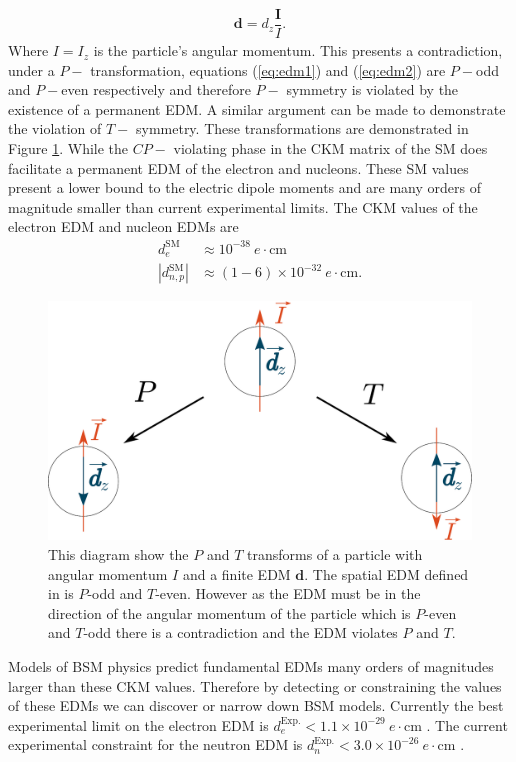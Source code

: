 \documentclass[10pt,a4paper, twoside, openright]{report}
\begin{document}
\begin{align} \label{eq:edm2}
\textbf{d}  = d_z \dfrac{\textbf{I}}{I}.
\end{align}
Where $I = I_z$ is the particle's angular momentum. This presents a contradiction, under a  $P-$  transformation, equations (\ref{eq:edm1}) and (\ref{eq:edm2}) are $P-$odd and $P-$even respectively and therefore $P-$ symmetry is violated by the existence of a permanent EDM. A similar argument can be made to demonstrate the violation of $T-$ symmetry. These transformations are demonstrated in Figure \ref{fig:ParityTimeEDM}. While the $CP-$ violating phase in the CKM matrix of the SM does facilitate a permanent EDM of the electron and nucleons. These SM values present a lower bound to the electric dipole moments and are many orders of magnitude smaller than current experimental limits. The CKM values of the electron EDM\cite{Ng1996} and nucleon EDMs \cite{Seng2015} are
\begin{align}
d_{e}^{\text{SM}} &\approx 10^{-38} \ e\cdot\text{cm} \\
|d_{n,p}^{\text{SM}}| &\approx (1-6) \times 10^{-32} \ e\cdot\text{cm}.
\end{align} 
\begin{figure}
\includegraphics[scale=0.3]{./figures/EDM.eps}
\caption[Parity and time reversal transforms of a permanent EDM]{\label{fig:ParityTimeEDM} This diagram show the $P$ and $T$ transforms of a particle with angular momentum $I$ and a finite EDM $\textbf{d}$. The spatial EDM defined in  is $P$-odd and $T$-even. However as the EDM must be in the direction of the angular momentum of the particle which is $P$-even and $T$-odd there is a contradiction and the EDM violates $P$ and $T$.}
\end{figure}
Models of BSM physics predict  fundamental EDMs many orders of magnitudes larger than these CKM values. Therefore by detecting or constraining the values of these EDMs we can discover or narrow down BSM models. Currently the best experimental limit on the electron EDM is $d_{e}^{\text{Exp.}} < 1.1 \times 10^{-29} \ e\cdot\text{cm}$ \cite{ACME2018}. The current experimental constraint for the neutron EDM is  $d_{n}^{\text{Exp.}} < 3.0 \times 10^{-26} \ e\cdot\text{cm}$ \cite{Pendlebury2015}. \\
\end{document}
